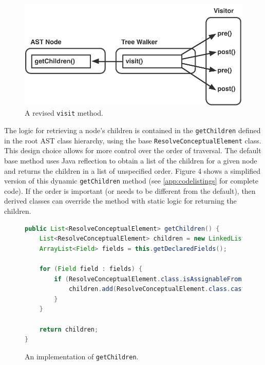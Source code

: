 \documentclass[times]{speauth}
\begin{document}
\begin{figure}[!htb]
\centering
\includegraphics[scale=.60]{figures/prepostprepost.pdf}
\caption{A revised \texttt{visit} method.}
\end{figure}

The logic for retrieving a node's children is contained in the \texttt{getChildren} defined in the root AST class hierarchy, using the base \texttt{ResolveConceptualElement} class. This design choice allows for more control over the order of traversal. The default base method uses Java reflection to obtain a list of the children for a given node and returns the children in a list of unspecified order. Figure 4 shows a simplified version of this dynamic \texttt{getChildren} method (see \ref{app:codelistings} for complete code). If the order is important (or needs to be different from the default), then derived classes can override the method with static logic for returning the children.

\begin{figure}[!htb]
\centering
\begin{minipage}{.80\textwidth}
\begin{lstlisting}[language=java]
public List<ResolveConceptualElement> getChildren() {
    List<ResolveConceptualElement> children = new LinkedList<>();
    ArrayList<Field> fields = this.getDeclaredFields();

    for (Field field : fields) {
        if (ResolveConceptualElement.class.isAssignableFrom(field.getType())) {
            children.add(ResolveConceptualElement.class.cast(field.get(this)));
        }
    }

    return children;
}
\end{lstlisting}
\end{minipage}
\caption{An implementation of \texttt{getChildren}.}
\label{fig:getchildren}
\end{figure}
\end{document}
